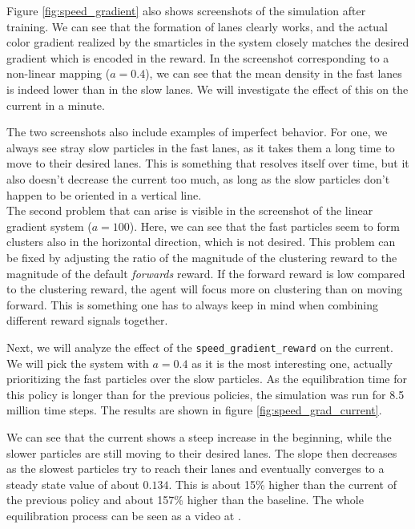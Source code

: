 Figure \ref{fig:speed_gradient} also shows screenshots of the simulation after training. We can see that the formation of lanes clearly works, and the actual color gradient realized by the smarticles in the system closely matches the desired gradient which is encoded in the reward. In the screenshot corresponding to a non-linear mapping ($a=0.4$), we can see that the mean density in the fast lanes is indeed lower than in the slow lanes. We will investigate the effect of this on the current in a minute. 


The two screenshots also include examples of imperfect behavior. For one, we always see stray slow particles in the fast lanes, as it takes them a long time to move to their desired lanes. This is something that resolves itself over time, but it also doesn't decrease the current too much, as long as the slow particles don't happen to be oriented in a vertical line. 
\\
The second problem that can arise is visible in the screenshot of the linear gradient system ($a=100$). Here, we can see that the fast particles seem to form clusters also in the horizontal direction, which is not desired. This problem can be fixed by adjusting the ratio of the magnitude of the clustering reward to the magnitude of the default \textit{forwards} reward. If the forward reward is low compared to the clustering reward, the agent will focus more on clustering than on moving forward. This is something one has to always keep in mind when combining different reward signals together.


Next, we will analyze the effect of the \texttt{speed\_gradient\_reward} on the current. We will pick the system with $a=0.4$ as it is the most interesting one, actually prioritizing the fast particles over the slow particles. As the equilibration time for this policy is longer than for the previous policies, the simulation was run for 8.5 million time steps. The results are shown in figure \ref{fig:speed_grad_current}. 


We can see that the current shows a steep increase in the beginning, while the slower particles are still moving to their desired lanes. The slope then decreases as the slowest particles try to reach their lanes and eventually converges to a steady state value of about $0.134$. This is about 15\% higher than the current of the previous policy and about 157\% higher than the baseline. The whole equilibration process can be seen as a video at \cite{maertens_smarticle_lane_vid}.

